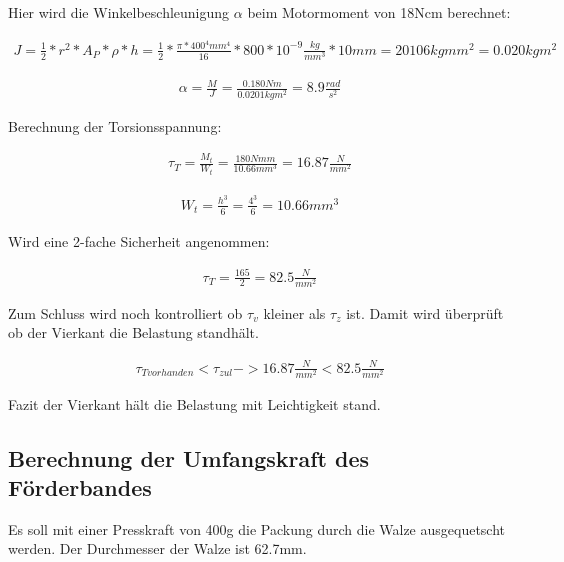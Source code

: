 Hier wird die Winkelbeschleunigung $\alpha$ beim Motormoment von 18Ncm berechnet:

\begin{align*}
J = \frac{1}{2}*r^{2}*A_{ P }*\rho*h=\frac{1}{2}*\frac{ \pi*400^{4}mm^{4} }{16}*800*10^{-9}\frac{ kg }{ mm^{3} }*10mm= 20106kg mm^{2} = 0.020kg m^{2}
\end{align*}

\begin{align*}
\alpha = \frac{ M }{ J }=\frac{ 0.180Nm }{ 0.0201kgm^{2} } = 8.9 \frac{ rad }{ s^{2} }
\end{align*}

Berechnung der Torsionsspannung:

\begin{align*}
\tau_{ T } = \frac{ M_{ t } }{W_{ t } } = \frac{ 180 Nmm }{ 10.66 mm^{3} } = 16.87\frac{ N }{mm^{2}}
\end{align*}

\begin{align*}
W_t = \frac{h^{3}}{6} = \frac{4^{3}}{6} = 10.66mm^{3}
\end{align*}


Wird eine 2-fache Sicherheit angenommen:

\begin{align*}
\tau_T=\frac{165}{2}=82.5\frac{N}{mm^{2}}
\end{align*}

Zum Schluss wird noch kontrolliert ob $\tau_v$ kleiner als $\tau_z$ ist.
Damit wird überprüft ob der Vierkant die Belastung standhält.

\begin{align*}
\tau_{T vorhanden} < \tau_{zul}  ->  16.87 \frac{N}{mm^{2}} < 82.5\frac{N}{mm^{2}}
\end{align*}

Fazit der Vierkant hält die Belastung mit Leichtigkeit stand.

\subsection{Berechnung der Umfangskraft des Förderbandes}

Es soll mit einer Presskraft von 400g die Packung durch die Walze ausgequetscht werden. Der Durchmesser der Walze ist 62.7mm.


